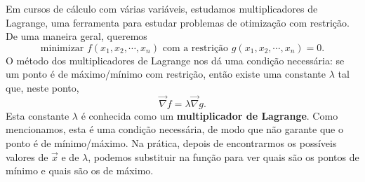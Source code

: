 \documentclass[../livro.tex]{subfiles}
\begin{document}
\begin{remark}[Opcional]
	Em cursos de cálculo com várias variáveis, estudamos multiplicadores de Lagrange, uma ferramenta para estudar problemas de otimização com restrição. De uma maneira geral, queremos
	\begin{equation}
	\text{minimizar } f(x_1, x_2, \cdots, x_n) \text{ com a restrição } g(x_1, x_2, \cdots, x_n) = 0.
	\end{equation} O método dos multiplicadores de Lagrange nos dá uma condição necessária: se um ponto é de máximo/mínimo com restrição, então existe uma constante $\lambda$ tal que, neste ponto,
	\begin{equation}
	\vec{\nabla} f = \lambda \vec{\nabla} g.
	\end{equation} Esta constante $\lambda$ é conhecida como um \textbf{multiplicador de Lagrange}. Como mencionamos, esta é uma condição necessária, de modo que não garante que o ponto é de mínimo/máximo. Na prática, depois de encontrarmos os possíveis valores de $\vec{x}$ e de $\lambda$, podemos substituir na função para ver quais são os pontos de mínimo e quais são os de máximo.
	

\end{remark}
\end{document}
